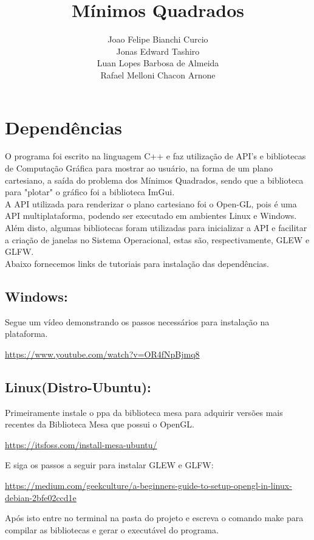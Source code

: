\documentclass[14pt, letterpaper]{article}
\author{
        Joao Felipe Bianchi Curcio\\
        Jonas Edward Tashiro\\ 
        Luan Lopes Barbosa de Almeida\\ 
        Rafael Melloni Chacon Arnone\\ 
       }
\date{}
\title{
  \Huge{Mínimos Quadrados}\\[60.0mm]
}
\newcommand\tab[1][1cm]{\hspace*{#1}}
\begin{document}
\maketitle
    
\newpage
\tableofcontents
\newpage

\section{Dependências}
\tab O programa foi escrito na linguagem C++ e faz utilização de API's e bibliotecas de  
Computação Gráfica para mostrar ao usuário, na forma de um plano cartesiano, a saída do 
problema dos Mínimos Quadrados, sendo que a biblioteca para "plotar" o gráfico foi a
biblioteca ImGui.\\[3.0mm] 
\tab A API utilizada para renderizar o plano cartesiano foi o Open-GL, pois é uma API 
multiplataforma, podendo ser executado em ambientes Linux e Windows. Além disto, 
algumas bibliotecas foram utilizadas para inicializar a API e facilitar a criação de 
janelas no Sistema Operacional, estas são, respectivamente, GLEW e GLFW.\\[3.0mm] 
\tab Abaixo fornecemos links de tutoriais para instalação das dependências.\\[3.0mm] 
\subsection{Windows:}
\tab Segue um vídeo demonstrando os passos necessários para instalação na plataforma.
\begin{center}
  \url{https://www.youtube.com/watch?v=OR4fNpBjmq8} 
\end{center}
\subsection{Linux(Distro-Ubuntu):}
\tab Primeiramente instale o ppa da biblioteca mesa para adquirir versões mais 
recentes da Biblioteca Mesa que possui o OpenGL.
\begin{center}
  \url{https://itsfoss.com/install-mesa-ubuntu/}
\end{center}
\tab E siga os passos a seguir para instalar GLEW e GLFW:
\begin{center}
  \url{https://medium.com/geekculture/a-beginners-guide-to-setup-opengl-in-linux-debian-2bfe02ccd1e}
\end{center}
\tab Após isto entre no terminal na pasta do projeto e escreva o comando make para compilar 
as bibliotecas e gerar o executável do programa. 
\end{document}
